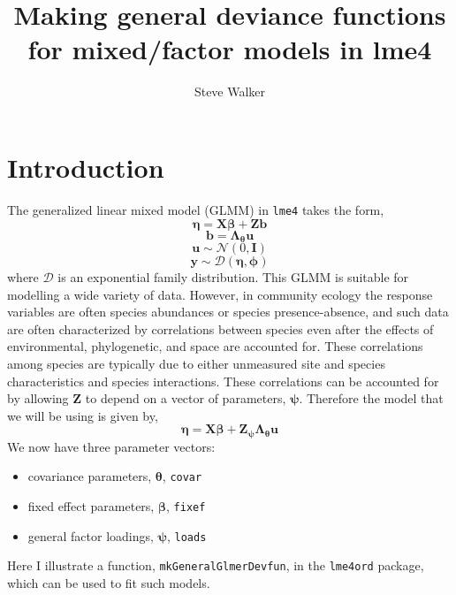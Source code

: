 \documentclass[12pt]{article}\usepackage[]{graphicx}\usepackage[]{color}
\author{Steve Walker}
\title{Making general deviance functions for mixed/factor models in lme4}
\date{}
\newcommand{\dnorm}{\mathcal{N}}
\newcommand{\dexpfam}{\mathcal{D}}
\begin{document}
\maketitle
\tableofcontents



\section{Introduction}

The generalized linear mixed model (GLMM) in \texttt{lme4} takes the
form,
\begin{equation}
  \label{eq:6}
  \bm\eta = \bm X\bm\beta + \bm Z\bm b
\end{equation}
\begin{equation}
  \label{eq:10}
  \bm b = \bm\Lambda_{\bm\theta}\bm u
\end{equation}
\begin{equation}
  \label{eq:7}
  \bm u \sim \dnorm(0, \bm I)
\end{equation}
\begin{equation}
  \label{eq:8}
  \bm y \sim \dexpfam (\bm\eta, \bm\phi)
\end{equation}
where $\dexpfam$ is an exponential family distribution. This GLMM is
suitable for modelling a wide variety of data.  However, in community
ecology the response variables are often species abundances or species
presence-absence, and such data are often characterized by
correlations between species even after the effects of environmental,
phylogenetic, and space are accounted for.  These correlations among
species are typically due to either unmeasured site and species
characteristics and species interactions.  These correlations can be
accounted for by allowing $\bm Z$ to depend on a vector of parameters,
$\bm\psi$.  Therefore the model that we will be using is given by,
\begin{equation}
  \label{eq:6}
  \bm\eta = \bm X\bm\beta + \bm Z_{\bm\psi}\bm\Lambda_{\bm\theta}\bm u
\end{equation}
We now have three parameter vectors:
\begin{itemize}
\item covariance parameters, $\bm\theta$, \texttt{covar}
\item fixed effect parameters, $\bm\beta$, \texttt{fixef}
\item general factor loadings, $\bm\psi$, \texttt{loads}
\end{itemize}
Here I illustrate a function, \texttt{mkGeneralGlmerDevfun}, in the
\texttt{lme4ord} package, which can be used to fit such models.
\end{document}
